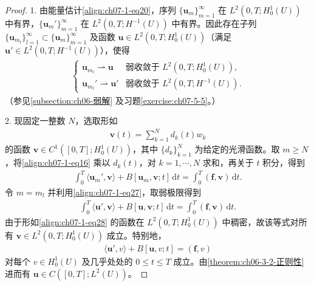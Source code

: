 \documentclass[../../main.tex]{subfiles}
\begin{document}
\begin{proof}
1. 由能量估计\eqref{align:ch07-1-eq20}，序列 $\{\mathbf{u}_m\}_{m=1}^\infty$ 在 $L^2(0,T;H^1_0(U))$ 中有界，$\{\mathbf{u}_m'\}_{m=1}^\infty$ 在 $L^2(0,T;H^{-1}(U))$ 中有界。因此存在子列 $\{\mathbf{u}_{m_l}\}_{l=1}^\infty\subset\{\mathbf{u}_m\}_{m=1}^\infty$ 及函数 $\mathbf{u}\in L^2(0,T;H^1_0(U))$（满足 $\mathbf{u}'\in L^2(0,T;H^{-1}(U))$），使得
\begin{align}
\begin{cases}
\mathbf{u}_{m_l} \rightharpoonup \mathbf{u} & \text{弱收敛于 } L^2(0,T;H^1_0(U)),\\
\mathbf{u}_{m_l}' \rightharpoonup \mathbf{u}' & \text{弱收敛于 } L^2(0,T;H^{-1}(U)).
\end{cases}\label{align:ch07-1-eq27}
\end{align}
（参见\cref{subsection:ch06-弱解} 及习题\cref{exercise:ch07-5-5}。）

2. 现固定一整数 $N$，选取形如
\begin{align}
\mathbf{v}(t) = \sum_{k=1}^N d_k(t)w_k\label{align:ch07-1-eq28}
\end{align}
的函数 $\mathbf{v}\in C^1([0,T];H^1_0(U))$，其中 $\{d_k\}_{k=1}^N$ 为给定的光滑函数。取 $m\geqslant N$，将\eqref{align:ch07-1-eq16} 乘以 $d_k(t)$，对 $k=1,\cdots,N$ 求和，再关于 $t$ 积分，得到
\begin{align}
\int_0^T \langle\mathbf{u}_m',\mathbf{v}\rangle + B[\mathbf{u}_m,\mathbf{v};t]\,\mathrm{d}t = \int_0^T (\mathbf{f},\mathbf{v})\,\mathrm{d}t.\label{align:ch07-1-eq29}
\end{align}
令 $m=m_l$ 并利用\eqref{align:ch07-1-eq27}，取弱极限得到
\begin{align}
\int_0^T \langle\mathbf{u}',\mathbf{v}\rangle + B[\mathbf{u},\mathbf{v};t]\,\mathrm{d}t = \int_0^T (\mathbf{f},\mathbf{v})\,\mathrm{d}t.\label{align:ch07-1-eq30}
\end{align}
由于形如\eqref{align:ch07-1-eq28} 的函数在 $L^2(0,T;H^1_0(U))$ 中稠密，故该等式对所有 $\mathbf{v}\in L^2(0,T;H^1_0(U))$ 成立。特别地，
\begin{align}
\langle\mathbf{u}',v\rangle + B[\mathbf{u},v;t] = (\mathbf{f},v)\label{align:ch07-1-eq31}
\end{align}
对每个 $v\in H^1_0(U)$ 及几乎处处的 $0\leqslant t\leqslant T$ 成立。由\cref{theorem:ch06-3-2-正则性} 进而有 $\mathbf{u}\in C([0,T];L^2(U))$。


\end{proof}
\end{document}
